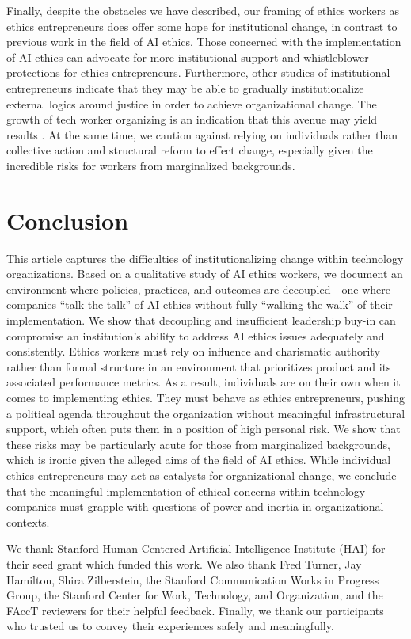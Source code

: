 \documentclass[sigconf]{acmart}
\begin{document}
Finally, despite the obstacles we have described, our framing of ethics workers as ethics entrepreneurs does offer some hope for institutional change, in contrast to previous work in the field of AI ethics. Those concerned with the implementation of AI ethics can advocate for more institutional support and whistleblower protections for ethics entrepreneurs. Furthermore, other studies of institutional entrepreneurs indicate that they may be able to gradually institutionalize external logics around justice in order to achieve organizational change. The growth of tech worker organizing is an indication that this avenue may yield results \cite{kramer_tech_2021}. At the same time, we caution against relying on individuals rather than collective action and structural reform to effect change, especially given the incredible risks for workers from marginalized backgrounds.

\section{Conclusion}

This article captures the difficulties of institutionalizing change within technology organizations. Based on a qualitative study of AI ethics workers, we document an environment where policies, practices, and outcomes are decoupled—one where companies “talk the talk” of AI ethics without fully “walking the walk” of their implementation. We show that decoupling and insufficient leadership buy-in can compromise an institution’s ability to address AI ethics issues adequately and consistently. Ethics workers must rely on influence and charismatic authority rather than formal structure in an environment that prioritizes product and its associated performance metrics. As a result, individuals are on their own when it comes to implementing ethics. They must behave as ethics entrepreneurs, pushing a political agenda throughout the organization without meaningful infrastructural support, which often puts them in a position of high personal risk. We show that these risks may be particularly acute for those from marginalized backgrounds, which is ironic given the alleged aims of the field of AI ethics. While individual ethics entrepreneurs may act as catalysts for organizational change, we conclude that the meaningful implementation of ethical concerns within technology companies must grapple with questions of power and inertia in organizational contexts.

\begin{acks}
We thank Stanford Human-Centered Artificial Intelligence Institute (HAI) for their seed grant which funded this work. We also thank Fred Turner, Jay Hamilton, Shira Zilberstein, the Stanford Communication Works in Progress Group, the Stanford Center for Work, Technology, and Organization, and the FAccT reviewers for their helpful feedback. Finally, we thank our participants who trusted us to convey their experiences safely and meaningfully.
\end{acks}



\end{document}
